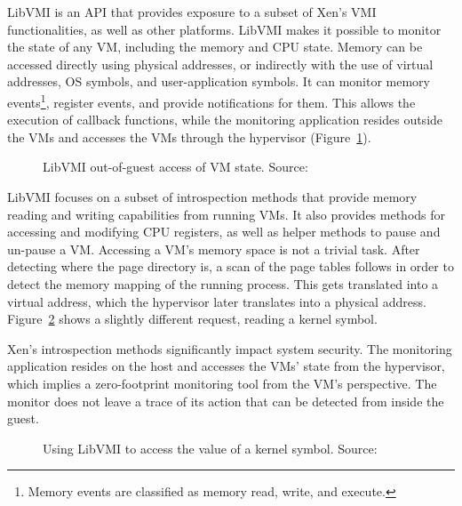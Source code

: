 \par LibVMI is an \ac{API} that provides exposure to a subset of Xen’s \ac{VMI} functionalities, as well as other platforms. LibVMI makes it possible to monitor the state of any \ac{VM}, including the memory and \ac{CPU} state. Memory can be accessed directly using physical addresses, or indirectly with the use of virtual addresses, \ac{OS} symbols, and user-application symbols. It can monitor memory events\footnote{Memory events are classified as memory read, write, and execute.}, register events, and provide notifications for them. This allows the execution of callback functions, while the monitoring application resides outside the \acp{VM} and accesses the \acp{VM} through the hypervisor (Figure~\ref{fig:libvmi}). 


\begin{figure}[ht]
	\centering
	
	\caption{LibVMI out-of-guest access of \ac{VM} state. Source:~\cite{libvmi}}
	\label{fig:libvmi}
\end{figure}

\par LibVMI focuses on a subset of introspection methods that provide memory reading and writing capabilities from running \ac{VM}s. It also provides methods for accessing and modifying \ac{CPU} registers, as well as helper methods to pause and un-pause a \ac{VM}. Accessing a \ac{VM}'s memory space is not a trivial task. After detecting where the page directory is, a scan of the page tables follows in order to detect the memory mapping of the running process. This gets translated into a virtual address, which the hypervisor later translates into a physical address. Figure~\ref{fig:accesskernel} shows a slightly different request, reading a kernel symbol.

\par Xen’s introspection methods significantly impact system security. The monitoring application resides on the host and accesses the \ac{VM}s' state from the hypervisor, which implies a zero-footprint monitoring tool from the \ac{VM}'s perspective. The monitor does not leave a trace of its action that can be detected from inside the guest.

\begin{figure}[ht]
	\centering
	
	\caption{Using LibVMI to access the value of a kernel symbol. Source:~\cite{libvmi}}
	\label{fig:accesskernel}
\end{figure}

